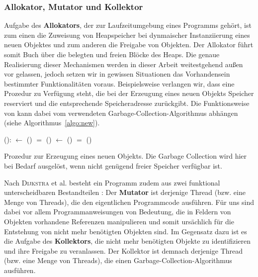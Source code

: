 
\subsubsection*{Allokator, Mutator und Kollektor}
Aufgabe des \textbf{Allokators}, der zur Laufzeitumgebung eines Programms gehört, ist zum einen die Zuweisung von Heapspeicher bei dynmaischer Instanziierung eines neuen Objektes und zum anderen die Freigabe von Objekten.
Der Allokator führt somit Buch über die belegten und freien Blöcke des Heaps.
Die genaue Realisierung dieser Mechanismen werden in dieser Arbeit weitestgehend außen vor gelassen, jedoch setzen wir in gewissen Situationen das Vorhandensein bestimmter Funktionalitäten voraus.
Beispielsweise verlangen wir, dass eine Prozedur  zu Verfügung steht, die bei der Erzeugung eines neuen Objekts Speicher reserviert und die entsprechende Speicheradresse zurückgibt.
Die Funktionsweise von  kann dabei vom verwendeten Garbage-Collection-Algorithmus abhängen (siehe Algorithmus~\ref{algo:new}).

\begin{algorithm}
\begin{algorithmic}[1]
	\State {}():
	\State \quad {} $\gets$ ()		
	\State \quad \IF {} $=$ \Null		{}
	\State \quad \quad {}()	
	\State \quad \quad {} $\gets$ ()	
	\State \quad \quad \IF {} $=$ \Null
	\State \quad \quad \quad {}()
	\State \quad \Return {}
\end{algorithmic}
\caption[Prozedur  zur Erzeugung eines neuen Objekts]{Prozedur  zur Erzeugung eines neuen Objekts. Die Garbage Collection wird hier bei Bedarf ausgelöst, wenn nicht genügend freier Speicher verfügbar ist.}
\label{algo:new}
\end{algorithm}

Nach \textsc{Dijkstra} et al. besteht ein Programm zudem aus zwei funktional unterscheidbaren Bestandteilen \cite[S. 967]{dijkstra1978}:
Der \textbf{Mutator} ist derjenige Thread (bzw. eine Menge von Threads), die den eigentlichen Programmcode ausführen.
Für uns sind dabei vor allem Programmanweisungen von Bedeutung, die in Feldern von Objekten vorhandene Referenzen manipulieren und somit ursächlich für die Entstehung von nicht mehr benötigten Objekten sind.
Im Gegensatz dazu ist es die Aufgabe des \textbf{Kollektors}, die nicht mehr benötigten Objekte zu identifizieren und ihre Freigabe zu veranlassen.
Der Kollektor ist demnach derjenige Thread (bzw. eine Menge von Threads), die einen Garbage-Collection-Algorithmus ausführen.


